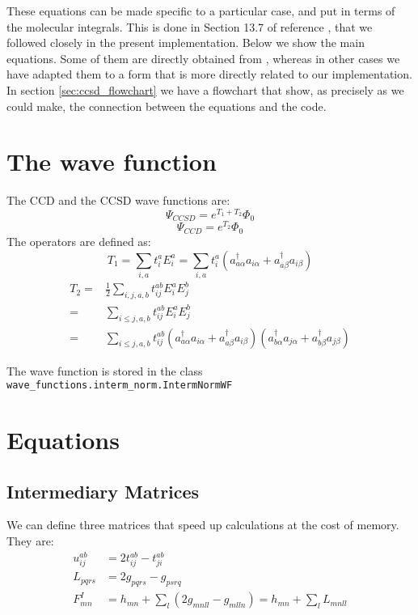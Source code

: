 These equations can be made specific to a particular case,
and put in terms of the molecular integrals.
This is done in Section 13.7 of reference \cite{}, that we followed closely in the present
implementation.
Below we show the main equations.
Some of them are directly obtained from \cite{},
whereas in other cases we have adapted them to a form that is more directly related to our implementation.
In section \ref{sec:ccsd_flowchart} we have a flowchart that show,
as precisely as we could make,
the connection between the equations and the code.

\section{The wave function}

The CCD and the CCSD wave functions are:
\begin{equation}
  \Psi_{CCSD} = e^{T_1 + T_2}\Phi_0
\end{equation}
\begin{equation}
  \Psi_{CCD} = e^{T_2}\Phi_0
\end{equation}
The operators are defined as:
\begin{equation}
  T_1 = \sum_{i,a} t_i^a E_i^a = \sum_{i,a} t_i^a (a_{a\alpha}^\dagger a_{i\alpha} + a_{a\beta}^\dagger a_{i\beta})
\end{equation}
\begin{equation}
  \begin{split}
    T_2 =& \frac{1}{2}\sum_{i,j,a,b} t_{ij}^{ab} E_i^aE_j^b\\
    =& \sum_{i \le j,a,b} t_{ij}^{ab} E_i^aE_j^b\\
    =& \sum_{i \le j,a,b} t_{ij}^{ab} (a_{a\alpha}^\dagger a_{i\alpha} + a_{a\beta}^\dagger a_{i\beta})
    (a_{b\alpha}^\dagger a_{j\alpha} + a_{b\beta}^\dagger a_{j\beta})
  \end{split}
\end{equation}

The wave function is stored in the class \texttt{wave\_functions.interm\_norm.IntermNormWF}


\section{Equations}

\subsection{Intermediary Matrices}
\hypertarget{sec:ccsd_inter_matrix}{}
\label{sec:ccsd_inter_matix}
We can define three matrices that speed up calculations at the cost of memory.
They are:
\begin{align}
    u_{ij}^{ab}&=2t_{ij}^{ab}-t_{ji}^{ab}\\
    L_{pqrs}&=2g_{pqrs}-g_{psrq}\\
    F_{mn}^I&=h_{mn}+\sum_l(2g_{mnll}-g_{mlln})=h_{mn}+\sum_lL_{mnll}
\end{align}

